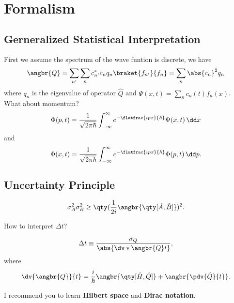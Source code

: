 \section{Formalism}
\subsection{Gerneralized Statistical Interpretation}
First we assume the spectrum of the wave funtion is discrete, we have
\[
	\angbr{Q} =\sum_{n'}\sum_nc^*_{n'}c_nq_n\braket{f_{n'}}{f_n}
	=\sum_n\abs{c_n}^2q_n
\] where $q_n$ is the eigenvalue of operator  $\hat{Q}$ and $\Psi(x,t)=\sum_nc_n(t)f_n(x)$.
What about momentum?
\[
	\Phi(p,t)=\frac{1}{\sqrt{2\pi\hbar}}\int_{-\infty}^{\infty} e^{-\flatfrac{ipx}{\hbar}}\Psi(x,t) \,\dd x
\] and 
\[
    \Phi(x,t)=\frac{1}{\sqrt{2\pi\hbar}}\int_{-\infty}^{\infty} e^{-\flatfrac{ipx}{\hbar}}\Phi(p,t) \,\dd p
.\] 
\subsection{Uncertainty Principle}
\begin{thm}
	\[
		\sigma_A^2\sigma_B^2\ge \qty(\frac{1}{2i}\angbr{\qty[\hat{A},\hat{B}]})^2
	.\] 
\end{thm}
How to interpret $ \Delta t$?
\begin{defi}
 	\[
		\Delta t\equiv\frac{\sigma_Q}{\abs{\dv*{\angbr{Q}}{t}}}
 	,\] where
	\[
		\dv{\angbr{Q}}{t}=
		\frac{i}{\hbar}\angbr{\qty[\hat{H},\hat{Q}]}+\angbr{\pdv{\hat{Q}}{t}}
	.\] 
\end{defi}
I recommend you to learn \textbf{Hilbert space} and \textbf{Dirac notation}.
